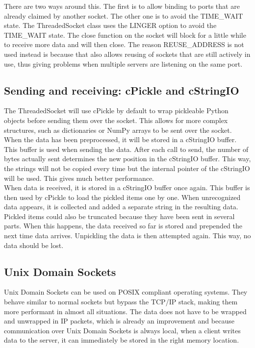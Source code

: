 \documentclass[a4paper, 10pt, oneside]{article}
\begin{document}
There are two ways around this. The first is to allow binding to ports that
are already claimed by another socket. The other one is to avoid the TIME\_WAIT
state. The ThreadedSocket class uses the LINGER option to avoid the TIME\_WAIT
state. The close function on the socket will block for a little while to receive
more data and will then close. The reason REUSE\_ADDRESS is not used instead is
because that also allows reusing of sockets that are still actively in use, thus
giving problems when multiple servers are listening on the same port.

\subsection{Sending and receiving: cPickle and cStringIO}
The ThreadedSocket will use cPickle by default to wrap pickleable Python objects
before sending them over the socket. This allows for more complex structures,
such as dictionaries or NumPy arrays to be sent over the socket.\\

When the data has been preprocessed, it will be stored in a cStringIO buffer.
This buffer is used when sending the data. After each call to send, the number
of bytes actually sent determines the new position in the cStringIO buffer. This
way, the strings will not be copied every time but the internal pointer of the
cStringIO will be used. This gives much better performance.\\

When data is received, it is stored in a cStringIO buffer once again. This
buffer is then used by cPickle to load the pickled items one by one. When
unrecognized data appears, it is collected and added a separate string in the
resulting data. Pickled items could also be truncated because they have been
sent in several parts. When this happens, the data received so far is stored and
prepended the next time data arrives. Unpickling the data is then attempted
again. This way, no data should be lost.

\subsection{Unix Domain Sockets}
Unix Domain Sockets can be used on POSIX compliant operating systems. They
behave similar to normal sockets but bypass the TCP/IP stack, making them more
performant in almost all situations. The data does not have to be
wrapped and unwrapped in IP packets, which is already an improvement and because
communication over Unix Domain Sockets is always local, when a client writes
data to the server, it can immediately be stored in the right memory location.\\
\end{document}
